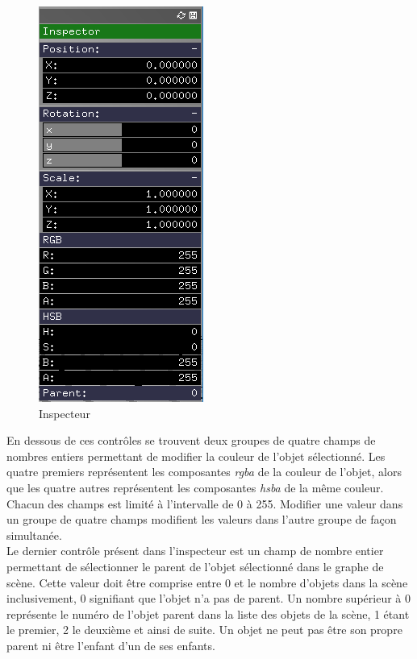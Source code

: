 \begin{figure}[H]
    \centering
	\includegraphics[scale=0.6]{fig/inspecteur.png}
	\caption{Inspecteur}
	\label{fig:inspecteur}
\end{figure}

En dessous de ces contrôles se trouvent deux groupes de quatre champs de nombres entiers permettant de modifier la couleur de l'objet sélectionné.
Les quatre premiers représentent les composantes \emph{rgba} de la couleur de l'objet, alors que les quatre autres représentent les composantes \emph{hsba} de la même couleur. Chacun des champs est limité à l'intervalle de 0 à 255. Modifier une valeur dans un groupe de quatre champs modifient les valeurs dans l'autre groupe de façon simultanée.\\

Le dernier contrôle présent dans l'inspecteur est un champ de nombre entier permettant de sélectionner le parent de l'objet sélectionné dans le graphe de scène.
Cette valeur doit être comprise entre 0 et le nombre d'objets dans la scène inclusivement, 0 signifiant que l'objet n'a pas de parent.
Un nombre supérieur à 0 représente le numéro de l'objet parent dans la liste des objets de la scène, 1 étant le premier, 2 le deuxième et ainsi de suite.
Un objet ne peut pas être son propre parent ni être l'enfant d'un de ses enfants.\\

